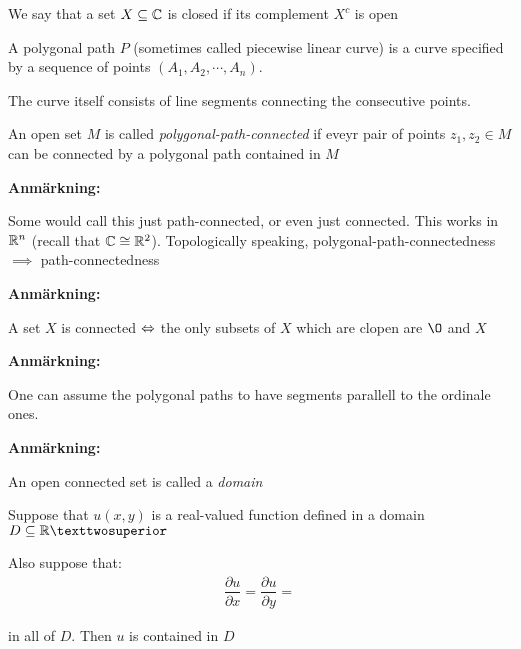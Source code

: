 \par\bigskip
\begin{theo}{}
  We say that a set $X\subseteq\mathbb{C}$ is closed if its complement $X^c$ is open
\end{theo}
\par\bigskip
\begin{theo}{}
  A polygonal path $P$ (sometimes called piecewise linear curve) is a curve specified by a sequence of points $(A_1,A_2,\cdots,A_n)$.\par
  \noindent The curve itself consists of line segments connecting the consecutive points. 
\end{theo}
\par\bigskip
\begin{theo}{}
  An open set $M$ is called \textit{polygonal-path-connected} if eveyr pair of points $z_1,z_2\in M$ can be connected by a polygonal path contained in $M$ 
\end{theo}
\par\bigskip
\noindent\textbf{Anmärkning:}\par
\noindent Some would call this just path-connected, or even just connected. This works in $\mathbb{R}^n$ (recall that $\mathbb{C}\cong\mathbb{R}^2$). Topologically speaking, polygonal-path-connectedness $\implies$ path-connectedness
\par\bigskip
\noindent\textbf{Anmärkning:}\par
\noindent A set $X$ is connected $\Leftrightarrow$ the only subsets of $X$ which are clopen are $\O$ and $X$
\par\bigskip
\noindent\textbf{Anmärkning:}\par
\noindent One can assume the polygonal paths to have segments parallell to the ordinale ones.
\par\bigskip
\noindent\textbf{Anmärkning:}\par
\noindent An open connected set is called a \textit{domain}
\par\bigskip
\begin{theo}[]{}
  Suppose that $u(x,y)$ is a real-valued function defined in a domain $D\subseteq\R²$\par
  \noindent Also suppose that:
  \begin{equation*}
    \begin{gathered}
      \dfrac{\partial u}{\partial x} = \dfrac{\partial u}{\partial y} = 
    \end{gathered}
  \end{equation*}
  \par\bigskip
  \noindent in all of $D$. Then $u$ is contained in $D$
\end{theo}

